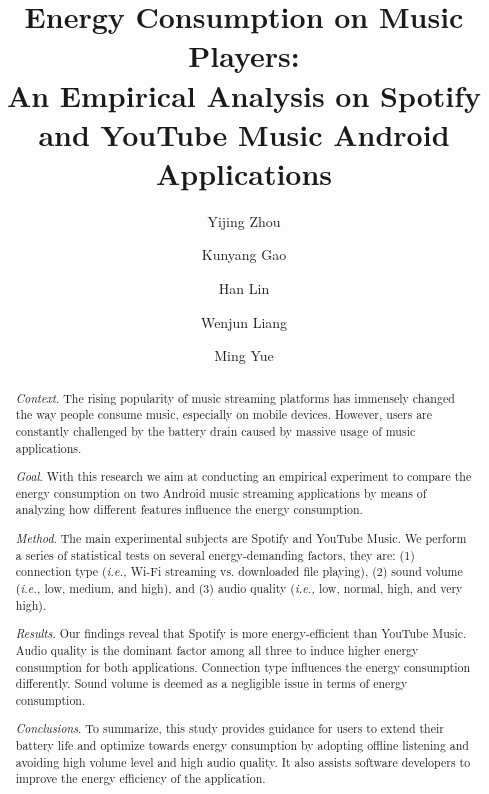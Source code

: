 \documentclass[sigconf,review]{acmart}
\newcommand{\ie}{\emph{i.e.,}\xspace}
\begin{document}
\title{
	Energy Consumption on Music Players:\\
 An Empirical Analysis on Spotify and YouTube Music Android Applications
}

\author{Yijing Zhou}
 

\author{Kunyang Gao}
 

\author{Han Lin}
 

\author{Wenjun Liang}
 

\author{Ming Yue}
 

\begin{abstract}
\noindent \textit{Context}. 
The rising popularity of music streaming platforms has immensely changed the way people consume music, especially on mobile devices. However, users are constantly challenged by the battery drain caused by massive usage of music applications.

\noindent \textit{Goal}. 
With this research we aim at conducting an empirical experiment to compare the energy consumption on two Android music streaming applications by means of analyzing how different features influence the energy consumption.  

\noindent \textit{Method}. 
The main experimental subjects are Spotify and YouTube Music. We perform a series of statistical tests on several energy-demanding factors, they are: (1) connection type (\ie Wi-Fi streaming vs. downloaded file playing), (2) sound volume (\ie low, medium, and high), and (3) audio quality (\ie low, normal, high, and very high).

\noindent \textit{Results}. 
Our findings reveal that Spotify is more energy-efficient than YouTube Music. Audio quality is the dominant factor among all three to induce higher energy consumption for both applications. Connection type influences the energy consumption differently. Sound volume is deemed as a negligible issue in terms of energy consumption. 

\noindent \textit{Conclusions}. 
 To summarize, this study provides guidance for users to extend their battery life and optimize towards energy consumption by adopting offline listening and avoiding high volume level and high audio quality. It also assists software developers to improve the energy efficiency of the application. 
\end{abstract}

\maketitle




 
 



 



\end{document}
